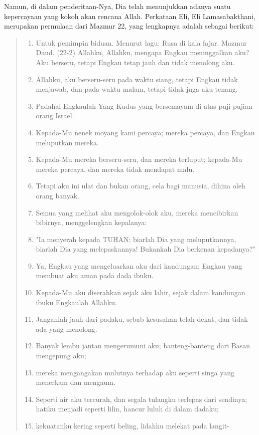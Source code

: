 Namun,
di dalam penderitaan-Nya, Dia telah menunjukkan adanya suatu kepercayaan yang
kokoh akan rencana Allah. Perkataan Eli, Eli Lamasabakthani, merupakan
permulaan dari Mazmur 22, yang lengkapnya adalah sebagai berikut:
\begin{quote}
\scriptsize
\begin{enumerate}
     \item  Untuk pemimpin biduan. Menurut lagu: Rusa di kala fajar. Mazmur
     Daud. (22-2) Allahku, Allahku, mengapa Engkau meninggalkan aku? Aku
     berseru, tetapi Engkau tetap jauh dan tidak menolong aku.
     \item Allahku, aku berseru-seru pada waktu siang, tetapi Engkau tidak
     menjawab, dan pada waktu malam, tetapi tidak juga aku tenang.
     \item Padahal Engkaulah Yang Kudus yang bersemayam di atas puji-pujian
     orang Israel.
     \item Kepada-Mu nenek moyang kami percaya; mereka percaya, dan Engkau
     meluputkan mereka.
     \item Kepada-Mu mereka berseru-seru, dan mereka terluput; kepada-Mu
     mereka percaya, dan mereka tidak mendapat malu.
     \item Tetapi aku ini ulat dan bukan orang, cela bagi manusia, dihina oleh
     orang banyak.
     \item Semua yang melihat aku mengolok-olok aku, mereka mencibirkan
     bibirnya, menggelengkan kepalanya:
     \item "Ia menyerah kepada TUHAN; biarlah Dia yang meluputkannya, biarlah
     Dia yang melepaskannya! Bukankah Dia berkenan kepadanya?"
     \item Ya, Engkau yang mengeluarkan aku dari kandungan; Engkau yang
     membuat aku aman pada dada ibuku.
     \item Kepada-Mu aku diserahkan sejak aku lahir, sejak dalam kandungan
     ibuku Engkaulah Allahku.
     \item Janganlah jauh dari padaku, sebab kesusahan telah dekat, dan tidak
     ada yang menolong.
     \item Banyak lembu jantan mengerumuni aku; banteng-banteng dari Basan
     mengepung aku;
     \item mereka mengangakan mulutnya terhadap aku seperti singa yang
     menerkam dan mengaum.
     \item Seperti air aku tercurah, dan segala tulangku terlepas dari
     sendinya; hatiku menjadi seperti lilin, hancur luluh di dalam dadaku;
     \item kekuatanku kering seperti beling, lidahku melekat pada langit-

\end{enumerate}
\end{quote}
